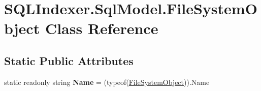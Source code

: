 \hypertarget{class_s_q_l_indexer_1_1_sql_model_1_1_file_system_object}{\section{S\-Q\-L\-Indexer.\-Sql\-Model.\-File\-System\-Object Class Reference}
\label{class_s_q_l_indexer_1_1_sql_model_1_1_file_system_object}
}
\subsection*{Static Public Attributes}
\begin{DoxyCompactItemize}
\item 
\hypertarget{class_s_q_l_indexer_1_1_sql_model_1_1_file_system_object_a305a11ea5fc9d22aeccc75524c941c5b}{static readonly string {\bfseries Name} = (typeof(\hyperlink{class_s_q_l_indexer_1_1_sql_model_1_1_file_system_object}{File\-System\-Object})).Name}\label{class_s_q_l_indexer_1_1_sql_model_1_1_file_system_object_a305a11ea5fc9d22aeccc75524c941c5b}

\end{DoxyCompactItemize}
